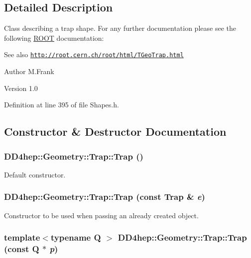 \subsection{Detailed Description}
Class describing a trap shape. For any further documentation please see the following \hyperlink{namespace_r_o_o_t}{ROOT} documentation: \begin{DoxySeeAlso}{See also}
\href{http://root.cern.ch/root/html/TGeoTrap.html}{\tt http://root.cern.ch/root/html/TGeoTrap.html}
\end{DoxySeeAlso}
\begin{DoxyAuthor}{Author}
M.Frank 
\end{DoxyAuthor}
\begin{DoxyVersion}{Version}
1.0 
\end{DoxyVersion}


Definition at line 395 of file Shapes.h.

\subsection{Constructor \& Destructor Documentation}
\hypertarget{class_d_d4hep_1_1_geometry_1_1_trap_a470134b52037e1e3d214c39e018872ee}{
\subsubsection[{Trap}]{\setlength{\rightskip}{0pt plus 5cm}DD4hep::Geometry::Trap::Trap ()}}
\label{class_d_d4hep_1_1_geometry_1_1_trap_a470134b52037e1e3d214c39e018872ee}


Default constructor. \hypertarget{class_d_d4hep_1_1_geometry_1_1_trap_a9d7a27adb3373cbb54352e0c2a36ce5d}{
\subsubsection[{Trap}]{\setlength{\rightskip}{0pt plus 5cm}DD4hep::Geometry::Trap::Trap (const {\bf Trap} \& {\em e})}}
\label{class_d_d4hep_1_1_geometry_1_1_trap_a9d7a27adb3373cbb54352e0c2a36ce5d}


Constructor to be used when passing an already created object. \hypertarget{class_d_d4hep_1_1_geometry_1_1_trap_ab956803ea8588582cf855ec1c8fbbc90}{
\subsubsection[{Trap}]{\setlength{\rightskip}{0pt plus 5cm}template$<$typename Q $>$ DD4hep::Geometry::Trap::Trap (const Q $\ast$ {\em p})}}
\label{class_d_d4hep_1_1_geometry_1_1_trap_ab956803ea8588582cf855ec1c8fbbc90}



